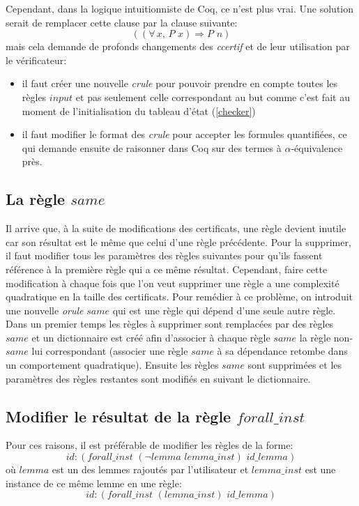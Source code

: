 \documentclass[11pt]{article}
\begin{document}
Cependant, dans la logique intuitionniste de Coq, ce n'est plus vrai. Une solution serait de remplacer cette clause par la clause suivante:
\[   ((\forall \, x, \, P\,\, x) \Rightarrow P \,\, n) \]
mais cela demande de profonds changements des \textit{ccertif} et de leur utilisation par le vérificateur: 
\begin{itemize}

\item il faut créer une nouvelle \textit{crule} pour pouvoir prendre en compte toutes les règles $input$ et pas seulement celle correspondant au but comme c'est fait au moment de l'initialisation du tableau d'état (\ref{checker})
\item il faut modifier le format des \textit{crule} pour accepter les formules quantifiées, ce qui demande ensuite de raisonner dans Coq sur des termes à $\alpha$-équivalence près.
\end{itemize}

\subsection{La règle $same$}

Il arrive que, à la suite de modifications des certificats, une règle devient inutile car son résultat est le même que celui d'une règle précédente. Pour la supprimer, il faut modifier tous les paramètres des règles suivantes pour qu'ils fassent référence à la première règle qui a ce même résultat. Cependant, faire cette modification à chaque fois que l'on veut supprimer une règle a une complexité quadratique en la taille des certificats. Pour remédier à ce problème, on introduit une nouvelle \textit{orule} $same$ qui est une règle qui dépend d'une seule autre règle. Dans un premier temps les règles à supprimer sont remplacées par des règles $same$ et un dictionnaire est créé afin d'associer à chaque règle $same$ la règle non-$same$ lui correspondant (associer une règle $same$ à sa dépendance retombe dans un comportement quadratique). Ensuite les règles $same$ sont supprimées et les paramètres des règles restantes sont modifiés en suivant le dictionnaire.

\subsection{Modifier le résultat de la règle $forall\_inst$} \label{processing_forallinst}

Pour ces raisons, il est préférable de modifier les règles de la forme:
\[id:(forall\_inst \,\,(\neg lemma \,\, lemma\_inst) \,\,id\_lemma)\]
où $lemma$ est un des lemmes rajoutés par l'utilisateur et $lemma\_inst$ est une instance de ce même lemme en une règle:
\[id:(forall\_inst \,\,(lemma\_inst) \,\, id\_lemma)\]
\end{document}
